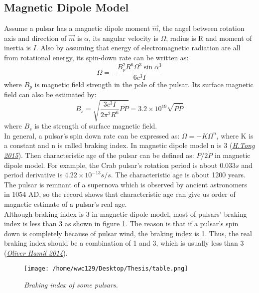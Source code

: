 \documentclass[12pt]{report}
\newcommand{\mycaption}[1]{\caption{\textit{\footnotesize #1}}}
\begin{document}
        \subsection{Magnetic Dipole Model}
            Assume a pulsar has a magnetic dipole moment $\vec{m}$, the angel between rotation axis and 
            direction of 
            $\vec{m}$ is $\alpha$, its angular velocity is $\Omega$, radius is R and moment of inertia is $I$. 
            Also by 
            assuming that energy of electromagnetic radiation are all from rotational energy, its spin-down 
            rate can be written 
            as: 
            $$
                \dot{\Omega}=-\frac{B_p^2 R^6 \Omega^3 \sin{\alpha}^3}{6c^3I}
            $$
            where $B_p$ is magnetic field strength in the pole of the pulsar. Its surface magnetic field can 
            also be estimated
            by:
            $$
                B_s=\sqrt{\frac{3c^3I}{2\pi^2R^6}P\dot{P}}=3.2\times 10^{19}\sqrt{P\dot{P}}
            $$
            where $B_s$ is the strength of surface magnetic field. \\
            \indent In general, a pulsar's spin down rate can be expressed as: $\dot{\Omega}=-K\Omega^{n}$, 
            where K is a 
            constant and n is called braking index. In magnetic dipole model n is 3 \hypersetup{urlcolor= red}
            (\href{https://arxiv.org/pdf/1506.04605.pdf}{\textit{H.Tong 2015}}). Then 
            characteristic age of the pulsar can be defined as: $P/2\dot{P}$ in magnetic dipole model. 
            For example, the Crab 
            pulsar's rotation period is about $0.033s$ and period derivative is $4.22\times 10^{-13}s/s$. 
            The characteristic 
            age is about 1200 years. The pulsar is remnant of a supernova which is observed by ancient 
            astronomers in 1054 
            AD, so the record shows that characteristic age can give us order of magnetic estimate of a 
            pulsar's real age. \\
            \indent 
            Although braking index is 3 in magnetic dipole model, most of pulsars' braking index is less than 3 as 
            shown in figure \ref{fig:braking_index}. The reason is that if a pulsar's spin down is completely because
            of pulsar wind, the braking index is 1. Thus, the real braking index should be a combination of 1 and 3,
            which is usually less than 3  \hypersetup{urlcolor= red}
            (\href{http://www.ift.uni.wroc.pl/~csqcdiv/talks/26092014/ohamil_csqcdiv.pdf}
            {\textit{Oliver Hamil 2014}}).
            \begin{figure}[!h]
              \centering
              \texttt{[image: /home/wwc129/Desktop/Thesis/table.png]}
              \mycaption{Braking index of some pulsars.}
              \label{fig:braking_index}
            \end{figure}
    
\end{document}
